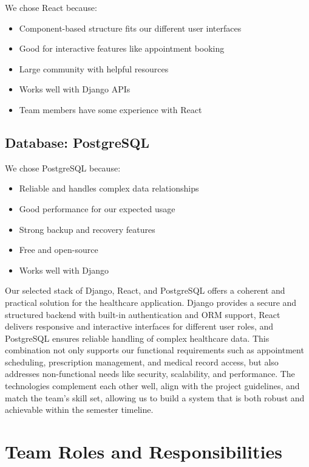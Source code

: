 \documentclass[12pt,a4paper]{article}
\newcommand{\sectionbreak}{\vspace{0.5cm}}
\begin{document}
We chose React because:
\begin{itemize}[itemsep=0.1cm]
    \item Component-based structure fits our different user interfaces
    \item Good for interactive features like appointment booking
    \item Large community with helpful resources
    \item Works well with Django APIs
    \item Team members have some experience with React
\end{itemize}

\subsection{Database: PostgreSQL}

We chose PostgreSQL because:
\begin{itemize}[itemsep=0.1cm]
    \item Reliable and handles complex data relationships
    \item Good performance for our expected usage
    \item Strong backup and recovery features
    \item Free and open-source
    \item Works well with Django
\end{itemize}


Our selected stack of Django, React, and PostgreSQL offers a coherent and practical solution for the healthcare application. Django provides a secure and structured backend with built-in authentication and ORM support, React delivers responsive and interactive interfaces for different user roles, and PostgreSQL ensures reliable handling of complex healthcare data. This combination not only supports our functional requirements such as appointment scheduling, prescription management, and medical record access, but also addresses non-functional needs like security, scalability, and performance. The technologies complement each other well, align with the project guidelines, and match the team’s skill set, allowing us to build a system that is both robust and achievable within the semester timeline.

\sectionbreak

\section{Team Roles and Responsibilities}
\end{document}
